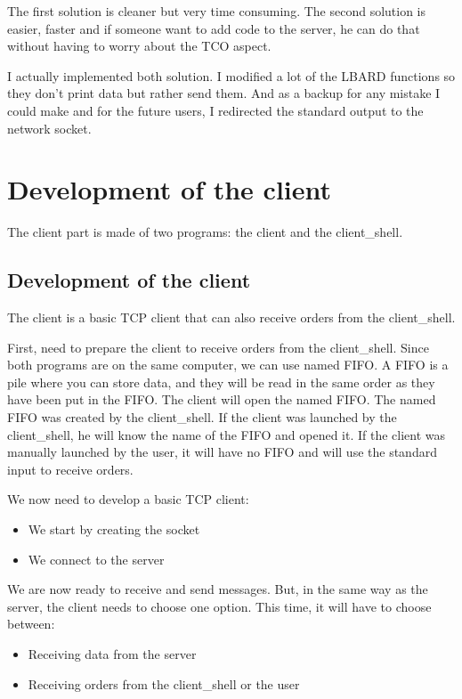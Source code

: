 The first solution is cleaner but very time consuming. The second solution is easier, faster and if someone want to add code to the server, he can do that without having to worry about the TCO aspect.

I actually implemented both solution. I modified a lot of the LBARD functions so they don't print data but rather send them. And as a backup for any mistake I could make and for the future users, I redirected the standard output to the network socket.




\section{Development of the client}

The client part is made of two programs: the client and the client\_shell.

\subsection{Development of the client}
The client is a basic TCP client that can also receive orders from the client\_shell.

First, need to prepare the client to receive orders from the client\_shell.
Since both programs are on the same computer, we can use named FIFO. A FIFO is a pile where you can store data, and they will be read in the same order as they have been put in the FIFO.
The client will open the named FIFO. The named FIFO was created by the client\_shell.
If the client was launched by the client\_shell, he will know the name of the FIFO and opened it. If the client was manually launched by the user, it will have no FIFO and will use the standard input to receive orders.



We now need to develop a basic TCP client:
\begin{itemize}
	\item We start by creating the socket
	\item We connect to the server
\end{itemize}
 
We are now ready to receive and send messages. But, in the same way as the server, the client needs to choose one option. This time, it will have to choose between:
\begin{itemize}
	\item Receiving data from the server
	\item Receiving orders from the client\_shell or the user
\end{itemize} 

